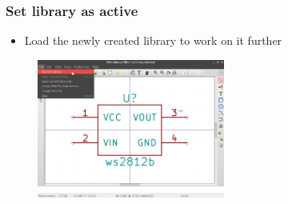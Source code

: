 \documentclass{beamer}
\begin{document}
\begin{frame}
  \frametitle{Set library as active}
  \begin{itemize}
    \item Load the newly created library to work on it further
  \end{itemize}
  \begin{figure}[H]
    \centering
    \includegraphics[width=0.55\textwidth]{images/step_06.png}
  \end{figure}
\end{frame}
\end{document}
